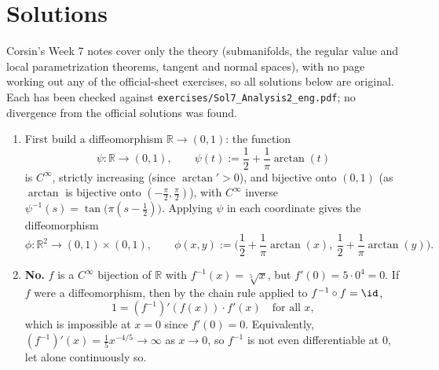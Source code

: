 \section{Solutions}
\label{sec:week07_solutions}

\begin{ainote}
Corsin's Week 7 notes cover only the theory (submanifolds, the regular value and local
parametrization theorems, tangent and normal spaces), with no page working out any of the
official-sheet exercises, so all solutions below are original. Each has been checked against
\texttt{exercises/Sol7\_Analysis2\_eng.pdf}; no divergence from the official solutions was found.
\end{ainote}

\begin{exercisesolution}
\begin{enumerate}[label=\textbf{(\alph*)}]
  \item First build a diffeomorphism $\mathbb{R} \to (0,1)$: the function
    \[\psi : \mathbb{R} \to (0,1), \qquad \psi(t) := \frac12+\frac1\pi\arctan(t)\]
    is $C^\infty$, strictly increasing (since $\arctan' > 0$), and bijective onto $(0,1)$ (as
    $\arctan$ is bijective onto $(-\tfrac\pi2,\tfrac\pi2)$), with $C^\infty$ inverse
    $\psi^{-1}(s) = \tan\big(\pi(s-\tfrac12)\big)$. Applying $\psi$ in each coordinate gives the
    diffeomorphism
    \[\phi : \mathbb{R}^2 \to (0,1)\times(0,1), \qquad \phi(x,y) := \Big(\frac12+\frac1\pi\arctan(x),\ \frac12+\frac1\pi\arctan(y)\Big).\]
  \item \textbf{No.} $f$ is a $C^\infty$ bijection of $\mathbb{R}$ with $f^{-1}(x) =
    \sqrt[5]{x}$, but $f'(0) = 5\cdot0^4 = 0$. If $f$ were a diffeomorphism, then by the
    chain rule applied to $f^{-1}\circ f = \id$,
    \[1 = (f^{-1})'(f(x))\cdot f'(x) \quad \text{for all } x,\]
    which is impossible at $x=0$ since $f'(0)=0$. Equivalently, $(f^{-1})'(x) =
    \tfrac15x^{-4/5} \to \infty$ as $x \to 0$, so $f^{-1}$ is not even differentiable at $0$,
    let alone continuously so.
\end{enumerate}
\end{exercisesolution}


